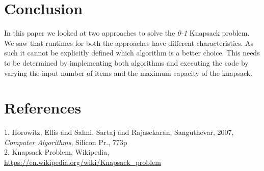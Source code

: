 \documentclass{article}
\begin{document}
\section{Conclusion}
In this paper we looked at two approaches to solve the \textit{0-1} Knapsack problem. We saw that runtimes for both the approaches have different characteristics. As such it cannot be explicitly defined which algorithm is a better choice. This needs to be determined by implementing both algorithms and executing the code by varying the input number of items and the maximum capacity of the knapsack.

\section{References}
1. Horowitz, Ellis and Sahni, Sartaj and Rajasekaran, Sanguthevar, 2007, \textit{Computer Algorithms}, Silicon Pr., 773p \\
2. Knapsack Problem, Wikipedia, \url{https://en.wikipedia.org/wiki/Knapsack_problem}
\end{document}
